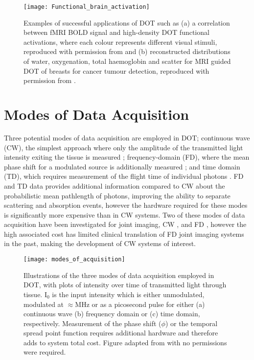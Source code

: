 \documentclass[twoside]{bhamthesis}
\theoremstyle{definition}
\begin{document}
\begin{figure}[!ht]
\centering
  \texttt{[image: Functional\_brain\_activation]}
\caption{Examples of successful applications of DOT such as (a) a correlation between fMRI BOLD signal and high-density DOT functional activations, where each colour represents different visual stimuli, reproduced with permission from \cite{eggebrecht2012quantitative} and (b) reconstructed distributions of water, oxygenation, total haemoglobin and scatter for MRI guided DOT of breasts for cancer tumour detection, reproduced with permission from \cite{carpenter2007image}.}
\label{fig:Breast_and_brain}
\end{figure}

\section{Modes of Data Acquisition}

Three potential modes of data acquisition are employed in DOT; continuous wave (CW), the simplest approach where only the amplitude of the transmitted light intensity exiting the tissue is measured \cite{xu2001imaging}; frequency-domain (FD), where the mean phase shift for a modulated source is additionally measured \cite{hielscher2011frequency}; and  time domain (TD), which requires measurement of the flight time of individual photons \cite{hebden2001three}. FD and TD data provides additional information compared to CW about the probabilistic mean pathlength of photons, improving the ability to separate scattering and absorption events, however the hardware required for these modes is significantly more expensive than in CW systems.  Two of these modes of data acquisition have been investigated for joint imaging, CW \cite{lighter2018multispectral,scheel2002assessment,schwaighofer2003classification},  and FD \cite{hielscher2011frequency,montejo2013computer2}, however the high associated cost has limited clinical translation of FD joint imaging systems in the past, making the development of CW systems of interest.

\begin{figure}[!ht]
  \centering
  \texttt{[image: modes\_of\_acquisition]}
\caption{Illustrations of the three modes of data acquisition employed in DOT, with plots of intensity over time of transmitted light through tissue. $\mathrm{I_0}$ is the input intensity which is either unmodulated, modulated at $\approx$MHz or as a picosecond pulse for either (a) continuous wave (b) frequency domain or (c) time domain, respectively. Measurement of the phase shift ($\phi$) or the temporal spread point function requires additional hardware and therefore adds to system total cost. Figure adapted from \cite{rupawala2018shining} with no permissions were required.}
\end{figure}
\end{document}
